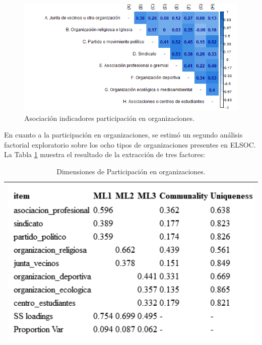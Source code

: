 \documentclass[
  12pt,
]{book}
\begin{document}
\begin{figure}[H]

{\centering \includegraphics[width=1\linewidth,height=1\textheight]{output/graphs/participacion-organizaciones_cor} 

}

\caption{Asociación indicadores participación en organizaciones.}\label{fig:participacion-organizaciones-cor}
\end{figure}

En cuanto a la participación en organizaciones, se estimó un segundo análisis factorial exploratorio sobre los ocho tipos de organizaciones presentes en ELSOC. La Tabla \ref{tab:organizaciones-fa} muestra el resultado de la extracción de tres factores:

\begin{longtable}[]{@{}l@{}}
\caption{\label{tab:organizaciones-fa}Dimensiones de Participación en organizaciones.}\tabularnewline
\toprule
\endhead
\includegraphics[width=5.20833in,height=\textheight]{output/tables/organizaciones_fa.png} \\
\bottomrule
\end{longtable}
\end{document}
